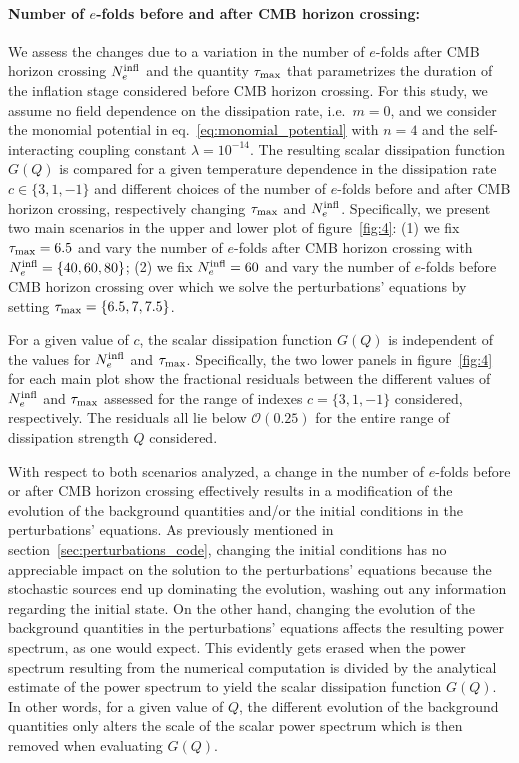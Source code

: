 \documentclass[a4paper,11pt]{article}
\begin{document}
\paragraph{Number of $e$-folds before and after CMB horizon crossing:}
We assess the changes due to a variation in the number of $e$-folds after CMB horizon crossing $N_{e}^{\rm infl}$ and the quantity $\tau_{\rm{max}}$ that parametrizes the duration of the inflation stage considered before CMB horizon crossing. For this study, we assume no field dependence on the dissipation rate, i.e.\ $m=0$, and we consider the monomial potential in eq.~\eqref{eq:monomial_potential} with $n=4$ and the self-interacting coupling constant $\lambda=10^{-14}$. The resulting scalar dissipation function $G(Q)$ is compared for a given temperature dependence in the dissipation rate $c\in \{3, 1, -1\}$ and different choices of the number of $e$-folds before and after CMB horizon crossing, respectively changing $\tau_{\rm{max}}$ and $N_{e}^{\rm infl}$. Specifically, we present two main scenarios in the upper and lower plot of figure~\ref{fig:4}: (1) we fix $\tau_{\rm{max}}=6.5$ and vary the number of $e$-folds after CMB horizon crossing with $N_{e}^{\rm infl}=\{40,60,80\}$; (2) we fix $N_{e}^{\rm infl}=60$ and vary the number of $e$-folds before CMB horizon crossing over which we solve the perturbations' equations by setting $\tau_{\rm{max}}=\{6.5,7,7.5\}$.

For a given value of $c$, the scalar dissipation function $G(Q)$ is independent of the values for $N_e^{\rm infl}$ and $\tau_{\rm{max}}$. Specifically, the two lower panels in figure~\ref{fig:4} for each main plot show the fractional residuals between the different values of $N_e^{\rm{infl}}$ and $\tau_{\rm{max}}$ assessed for the range of indexes $c=\{3,1,-1\}$ considered, respectively. The residuals all lie below $\mathcal{O}(0.25)$ for the entire range of dissipation strength $Q$ considered. 

With respect to both scenarios analyzed, a change in the number of $e$-folds before or after CMB horizon crossing effectively results in a modification of the evolution of the background quantities and/or the initial conditions in the perturbations' equations. As previously mentioned in section~\ref{sec:perturbations_code}, changing the initial conditions has no appreciable impact on the solution to the perturbations' equations because the stochastic sources end up dominating the evolution, washing out any information regarding the initial state. On the other hand, changing the evolution of the background quantities in the perturbations' equations affects the resulting power spectrum, as one would expect. This evidently gets erased when the power spectrum resulting from the numerical computation is divided by the analytical estimate of the power spectrum to yield the scalar dissipation function $G(Q)$. In other words, for a given value of $Q$, the different evolution of the background quantities only alters the scale of the scalar power spectrum  which is then removed when evaluating $G(Q)$.
\end{document}
